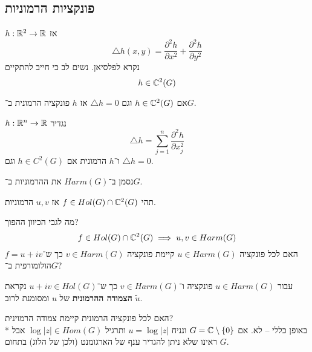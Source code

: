 \subsection{פונקציות הרמוניות}
\begin{definition}
	$h : \mathbb{R}^2 \to \mathbb{R}$ אז
	\[
		\triangle h(x, y) = \frac{\partial^2 h}{\partial x^2} + \frac{\partial^2 h}{\partial y^2}
	\]
	נקרא לפלסיאן.
	נשים לב כי חייב להתקיים
	\[
		h \in \mathbb{C}^2(G)
	\]
\end{definition}
אם $h \in \mathbb{C}^2(G)$ וגם $\triangle h = 0$ אז $h$ פונקציה הרמונית ב־$G$.
\begin{remark}
	$h : \mathbb{R}^n \to \mathbb{R}$ נגדיר
	\[
		\triangle h = \sum_{j = 1}^{n} \frac{\partial^2 h}{\partial x_j^2}
	\]
	ו־$h$ הרמונית אם $h \in C^2(G)$ וגם $\triangle h = 0$.
\end{remark}
נסמן ב־$Harm(G)$ את ההרמוניות ב־$G$.
\begin{exercise}
	תהי $f \in Hol(G) \cap \mathbb{C}^2(G)$ אז $u, v$ הרמוניות.
\end{exercise}
מה לגבי הכיוון ההפוך?
\[
	f \in Hol(G) \cap \mathbb{C}^2(G) \implies u, v \in Harm(G)
\]
האם לכל פונקציה $u \in Harm(G)$ קיימת פונקציה $v \in Harm(G)$ כך ש־$f = u + i v$ הולומורפית ב־$G$?
\begin{definition}
	עבור $u \in Harm(G)$ פונקציה ו־$v \in Harm(G)$ כך ש־$u + i v \in Hol(G)$ נקראת \textbf{הצמודה ההרמונית} של $u$ ומסומנת לרוב $\tilde{u}$.
\end{definition}
האם לכל פונקציה הרמונית קיימת צמודה הרמוינית? \\*
באופן כללי – לא.
אם $G = \mathbb{C} \setminus \{ 0 \}$ ונניח $u = \log|z|$ ותרגיל $\log|z| \in Hom(G)$ אבל ראינו שלא ניתן להגדיר ענף של הארגומנט (ולכן של הלוג) בתחום $G$.


